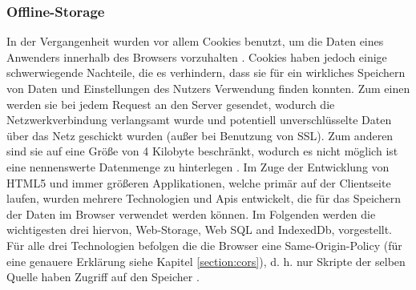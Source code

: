 \subsubsection{Offline-Storage}\label{section:offline_storage}
In der Vergangenheit wurden vor allem Cookies benutzt, um die Daten eines Anwenders innerhalb des Browsers vorzuhalten \cite{html5_rocks_offline_what_does_it_mean}. Cookies haben jedoch einige schwerwiegende Nachteile, die es verhindern, dass sie für ein wirkliches Speichern von Daten und Einstellungen des Nutzers Verwendung finden konnten. Zum einen werden sie bei jedem Request an den Server gesendet, wodurch die Netzwerkverbindung verlangsamt wurde und potentiell unverschlüsselte Daten über das Netz geschickt wurden (außer bei Benutzung von SSL). Zum anderen sind sie auf eine Größe von 4 Kilobyte beschränkt, wodurch es nicht möglich ist eine nennenswerte Datenmenge zu hinterlegen \cite{html5_up_and_running_chapter_7}. Im Zuge der Entwicklung von HTML5 und immer größeren Applikationen, welche primär auf der Clientseite laufen, wurden mehrere Technologien und Apis entwickelt, die für das Speichern der Daten im Browser verwendet werden können. Im Folgenden werden die wichtigesten drei hiervon, Web-Storage, Web SQL and IndexedDb, vorgestellt. Für alle drei Technologien befolgen die die Browser eine Same-Origin-Policy (für eine genauere Erklärung siehe Kapitel \ref{section:cors}), d. h. nur Skripte der selben Quelle haben Zugriff auf den Speicher \cite{html5_rocks_client_side_storage}. 

